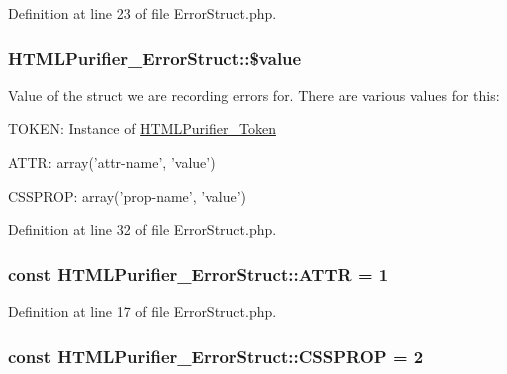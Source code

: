 Definition at line 23 of file Error\+Struct.\+php.

\hypertarget{classHTMLPurifier__ErrorStruct_a1c8bc4d3501b43b91cfd02e8d425a5c3}{
\subsubsection[{\$value}]{\setlength{\rightskip}{0pt plus 5cm}H\+T\+M\+L\+Purifier\+\_\+\+Error\+Struct\+::\$value}}\label{classHTMLPurifier__ErrorStruct_a1c8bc4d3501b43b91cfd02e8d425a5c3}
Value of the struct we are recording errors for. There are various values for this\+:
\begin{DoxyItemize}
\item T\+O\+K\+E\+N\+: Instance of \hyperlink{classHTMLPurifier__Token}{H\+T\+M\+L\+Purifier\+\_\+\+Token}
\item A\+T\+T\+R\+: array('attr-\/name', 'value')
\item C\+S\+S\+P\+R\+O\+P\+: array('prop-\/name', 'value') 
\end{DoxyItemize}

Definition at line 32 of file Error\+Struct.\+php.

\hypertarget{classHTMLPurifier__ErrorStruct_ac827cd11b6e14c916bab544fa5cb1a8e}{
\subsubsection[{A\+T\+T\+R}]{\setlength{\rightskip}{0pt plus 5cm}const H\+T\+M\+L\+Purifier\+\_\+\+Error\+Struct\+::\+A\+T\+T\+R = 1}}\label{classHTMLPurifier__ErrorStruct_ac827cd11b6e14c916bab544fa5cb1a8e}


Definition at line 17 of file Error\+Struct.\+php.

\hypertarget{classHTMLPurifier__ErrorStruct_affa564239eb2648a565c7fe7efe108e2}{
\subsubsection[{C\+S\+S\+P\+R\+O\+P}]{\setlength{\rightskip}{0pt plus 5cm}const H\+T\+M\+L\+Purifier\+\_\+\+Error\+Struct\+::\+C\+S\+S\+P\+R\+O\+P = 2}}\label{classHTMLPurifier__ErrorStruct_affa564239eb2648a565c7fe7efe108e2}


